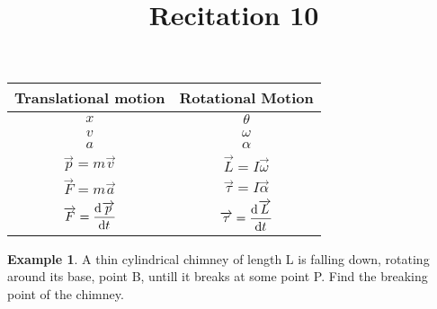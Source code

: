 \documentclass[fleqn, a4paper, 12pt]{article}
\title{Recitation 10}
\author{}
\date{\formatdate{31}{12}{2014}}
\theoremstyle{definition}
\newtheorem{example}{Example}
\theoremstyle{theorem}
\begin{document}
\maketitle


\tableofcontents

\newpage
\section{}

\begin{tabular}{|c|c|}
	\hline
	Translational motion & Rotational Motion\\
	\hline
	$x$ & $\theta$\\
	$v$ & $\omega$\\
	$a$ & $\alpha$\\
	$\overrightarrow{p} = m \overrightarrow{v}$ & $\overrightarrow{L} = I \overrightarrow{\omega}$\\
	$\overrightarrow{F} = m \overrightarrow{a}$ & $\overrightarrow{\tau} = I \overrightarrow{\alpha}$\\
	$\overrightarrow{F} = \dod{\overrightarrow{p}}{t}$ & $\overrightarrow{\tau} = \dod{\overrightarrow{L}}{t}$\\
	\hline
\end{tabular}

\begin{example}
	A thin cylindrical chimney of length L is falling down, rotating around its base, point B, untill it breaks at some point P. Find the breaking point of the chimney.\\
\end{example}
\end{document}
